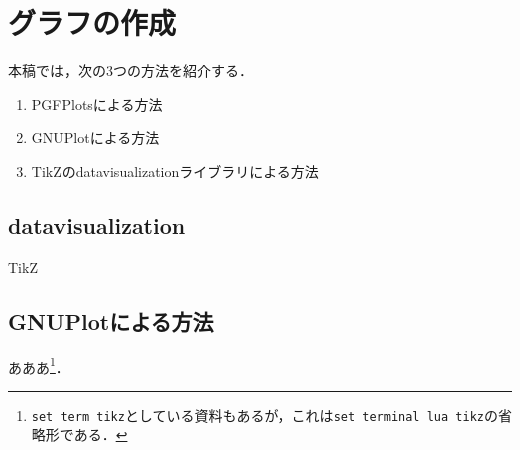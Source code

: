 \documentclass[../../index]{subfiles}
\begin{document}
\chapter{グラフの作成}
本稿では，次の3つの方法を紹介する．
\begin{enumerate}
  \item PGFPlotsによる方法
  \item GNUPlotによる方法
  \item TikZのdatavisualizationライブラリによる方法
\end{enumerate}

\section{datavisualization}
TikZ

\section{GNUPlotによる方法}
あああ\footnote{\texttt{set term tikz}としている資料もあるが，これは\texttt{set terminal lua tikz}の省略形である．}．
\end{document}
